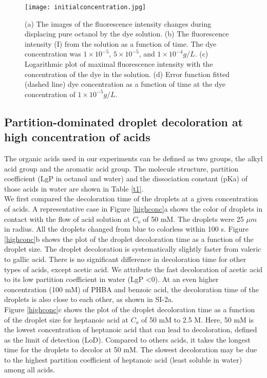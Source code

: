 \documentclass[journal=langd5,manuscript=article]{achemso}
\begin{document}
\begin{figure}[htp]
	\texttt{[image: initialconcentration.jpg]}
	\caption{ (a) The images of the fluorescence intensity changes during displacing pure octanol by the dye solution. (b) The fluorescence intensity (I) from the solution as a function of time. The dye concentration was $1\times10^{−5}$, $5\times10^{−5}$, and $1\times10^{−4}g/L$. (c) Logarithmic plot of maximal fluorescence intensity with the concentration of the dye in the solution. (d) Error function fitted (dashed line) dye concentration as a function of time at the dye concentration of $1\times10^{−5}g/L$.}
	\label{SI}
\end{figure}


\subsection{Partition-dominated droplet decoloration at high concentration of acids}
The organic acids used in our experiments can be defined as two groups, the alkyl acid group and the aromatic acid group. The molecule structure, partition coefficient (LgP in octanol and water) and the dissociation constant (pKa) of those acids in water are shown in Table \ref{t1}.\\ 
We first compared the decoloration time of the droplets at a given concentration of acids. A representative case in Figure \ref{highconc}a shows the color of droplets in contact with the flow of acid solution at $C_{o}$ of 50 mM. The droplets were 25 $\mu m$ in radius. All the droplets changed from blue to colorless within 100 s. Figure \ref{highconc}b shows the plot of the droplet decoloration time as a function of the droplet size. The droplet decoloration is systematically slightly faster from valeric to gallic acid. There is no significant difference in decoloration time for other types of acids, except acetic acid. We attribute the fast decoloration of acetic acid to its low partition coefficient in water (LgP \textless 0). At an even higher concentration (100 mM) of PHBA and benzoic acid, the decoloration time of the droplets is also close to each other, as shown in SI-2a.\\
Figure \ref{highconc}c shows the plot of the droplet decoloration time as a function of the droplet size for heptanoic acid at $C_o$ of 50 mM to 2.5 M. Here, 50 mM is the lowest concentration of heptanoic acid that can lead to decoloration, defined as the limit of detection (LoD). Compared to others acids, it takes the longest time for the droplets to decolor at 50 mM. The slowest decoloration may be due to the highest partition coefficient of heptanoic acid (least soluble in water) among all acids.
\end{document}

